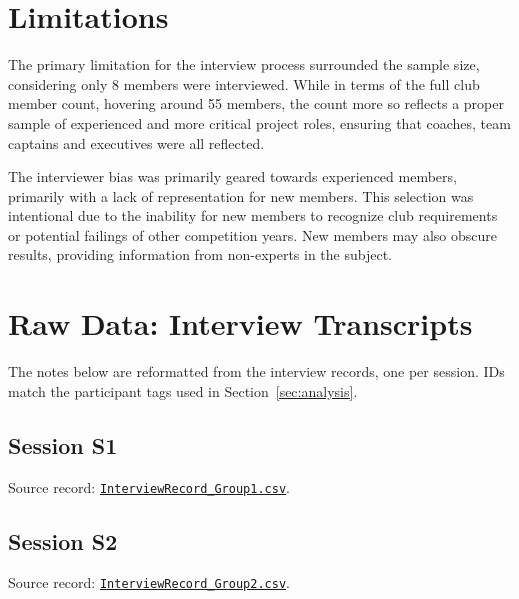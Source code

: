 \documentclass{article}
\begin{document}
\section{Limitations}
\label{sec:limitations}

The primary limitation for the interview process surrounded the sample size, considering only 8 members were interviewed. 
While in terms of the full club member count, hovering around 55 members, the count more so reflects a proper sample of 
experienced and more critical project roles, ensuring that coaches, team captains and executives were all reflected.

The interviewer bias was primarily geared towards experienced members, primarily with a lack of representation for new members. 
This selection was intentional due to the inability for new members to recognize club requirements or potential failings 
of other competition years. New members may also obscure results, providing information from non-experts in the subject.

\newpage
{}
{}



\newpage
\appendix

\section{Raw Data: Interview Transcripts}
\label{app:transcripts}

The notes below are reformatted from the interview records, one per session.
IDs match the participant tags used in Section~\ref{sec:analysis}.

\subsection{Session S1}
\label{app:s1}
Source record: \href{https://github.com/JackEaston4/Troitsky-Toolbox/blob/main/docs/CDs/Interviews/InterviewRecords/InterviewRecord_Group1.csv}{\texttt{InterviewRecord\_Group1.csv}}.



\subsection{Session S2}
\label{app:s2}
Source record: \href{https://github.com/JackEaston4/Troitsky-Toolbox/blob/main/docs/CDs/Interviews/InterviewRecords/InterviewRecord_Group2.csv}{\texttt{InterviewRecord\_Group2.csv}}.
\end{document}
